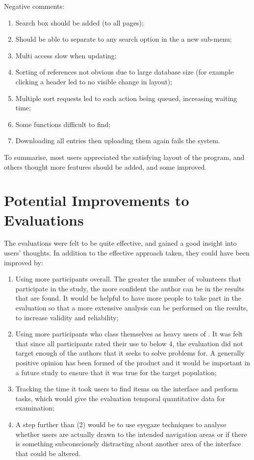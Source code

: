 \begin{enumerate}
	Negative comments:
	\begin{enumerate}
		\item Search box should be added (to all pages);
		\item Should be able to separate to any search option in the a new sub-menu;
		\item Multi access slow when updating;
		\item Sorting of references not obvious due to large database size (for example clicking a header led to no visible change in layout);
		\item Multiple sort requests led to each action being queued, increasing waiting time;
		\item Some functions difficult to find;
		\item Downloading all entries then uploading them again fails the system.
	\end{enumerate}

\end{enumerate}
To summarise, most users appreciated the satisfying layout of the program, and others thought more features should be added, and some improved. 

\section{Potential Improvements to Evaluations}
The evaluations were felt to be quite effective, and gained a good insight into users' thoughts.  In addition to the effective approach taken, they could have been improved by:
\begin{enumerate}
	\item Using more participants overall. The greater the number of volunteers that participate in the study, the more confident the author can be in the results that are found.  It would be helpful to have more people to take part in the evaluation so that a more extensive analysis can be performed on the results, to increase validity and reliability;
	\item Using more participants who class themselves as heavy users of \bibtex{}.  It was felt that since all participants rated their use to \bibtex{} below 4, the evaluation did not target enough of the authors that it seeks to solve problems for.  A generally positive opinion has been formed of the product and it would be important in a future study to ensure that it was true for the target population;
	\item Tracking the time it took users to find items on the interface and perform tasks, which would give the evaluation temporal quantitative data for examination;
	\item A step further than (2) would be to use eyegaze techniques to analyse whether users are actually drawn to the intended navigation areas or if there is something subconsciously distracting about another area of the interface that could be altered.
\end{enumerate}

